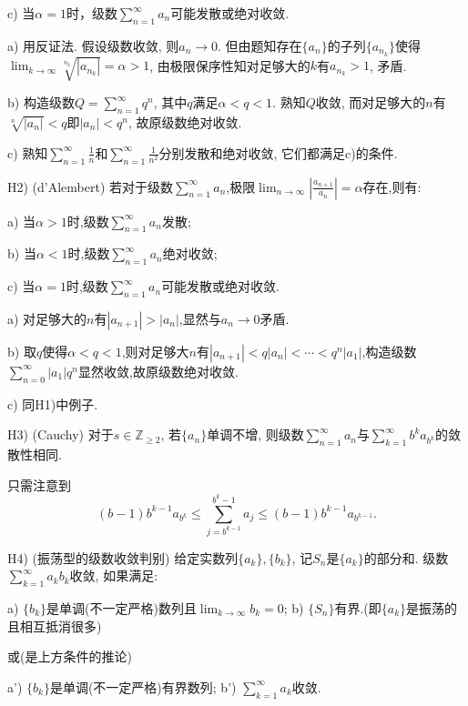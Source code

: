 	c) 当$\alpha =1$时，级数$\sum_{n=1}^{\infty} a_n$可能发散或绝对收敛.

\begin{solution}
	a) 用反证法. 假设级数收敛, 则$a_n \to 0$. 但由题知存在$\{ a_n \}$的子列$\{ a_{n_k} \}$使得$\lim_{k\to \infty} \sqrt[n_k]{|a_{n_k}|} = \alpha > 1$, 由极限保序性知对足够大的$k$有$a_{n_k}>1$, 矛盾.
	
	b) 构造级数$Q=\sum_{n=1}^{\infty} q^n$, 其中$q$满足$\alpha < q <1$. 熟知$Q$收敛, 而对足够大的$n$有$\sqrt[n]{|a_n|}<q$即$|a_n|<q^n$, 故原级数绝对收敛. 
	
	c) 熟知$\sum_{n=1}^{\infty} \frac{1}{n}$和$\sum_{n=1}^{\infty} \frac{1}{n^2}$分别发散和绝对收敛, 它们都满足c)的条件.
\end{solution}

H2) (d’Alembert) 若对于级数$\sum_{n=1}^{\infty} a_n$,极限$\lim_{n\to \infty}|\frac{a_{n+1}}{a_n} |=\alpha$存在,则有:
	
	a) 当$\alpha >1$时,级数$\sum_{n=1}^{\infty} a_n$发散;
	
	b) 当$\alpha <1$时,级数$\sum_{n=1}^{\infty} a_n$绝对收敛;
	
	c) 当$\alpha =1$时,级数$\sum_{n=1}^{\infty} a_n$可能发散或绝对收敛.
	
\begin{solution}
	a) 对足够大的$n$有$|a_{n+1}|>|a_n|$,显然与$a_n\to 0$矛盾.
	
	b) 取$q$使得$\alpha < q <1$,则对足够大$n$有$|a_{n+1}|<q|a_n|<\cdots < q^n|a_1|$,构造级数$\sum_{n=0}^{\infty} |a_1|q^n$显然收敛,故原级数绝对收敛.
	
	c) 同H1)中例子.
\end{solution}

H3) (Cauchy) 对于$s \in \mathbb{Z}_{\geq 2}$, 若$\{ a_n \}$单调不增, 则级数$\sum_{n=1}^{\infty} a_n$与$\sum_{k=1}^{\infty} b^k a_{b^k}$的敛散性相同. 

\begin{solution}
	只需注意到$$(b-1)b^{k-1}a_{b^k} \leq \sum_{j=b^{k-1}}^{b^k-1} a_j \leq (b-1)b^{k-1}a_{b^{k-1}}.$$
\end{solution}

H4) (振荡型的级数收敛判别) 给定实数列$\{ a_k \},\{ b_k \}$, 记$S_n$是$\{ a_k \}$的部分和. 级数$\sum_{k=1}^{\infty} a_kb_k$收敛, 如果满足: 

	a) $\{ b_k \}$是单调(不一定严格)数列且$\lim_{k\to \infty} b_k = 0$;  \qquad b) $\{ S_n \}$有界.(即$\{ a_k \}$是振荡的且相互抵消很多)
	
	或(是上方条件的推论)
	
	a') $\{ b_k \}$是单调(不一定严格)有界数列; \qquad b') $\sum_{k=1}^{\infty} a_k$收敛. 
















